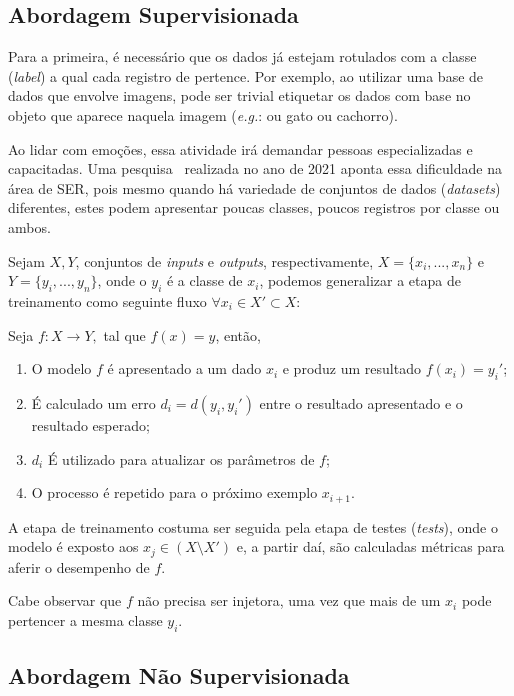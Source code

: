 \subsection{Abordagem Supervisionada}

Para a primeira, é necessário que os dados já estejam rotulados com a classe (\textit{label}) a qual cada registro de pertence. Por exemplo, ao utilizar uma base de dados que envolve imagens, pode ser trivial etiquetar os dados com base no objeto que aparece naquela imagem (\textit{e.g.}: ou gato ou cachorro).

Ao lidar com emoções, essa atividade irá demandar pessoas especializadas e capacitadas. Uma pesquisa~\cite{32} realizada no ano de 2021 aponta essa dificuldade na área de \acrshort{SER}, pois mesmo quando há variedade de conjuntos de dados (\textit{datasets}) diferentes, estes podem apresentar poucas classes, poucos registros por classe ou ambos.

Sejam $X, Y$, conjuntos de \textit{inputs} e \textit{outputs}, respectivamente, $X=\{x_i, ..., x_n\}$ e $Y=\{y_i, ..., y_n\}$, onde o $y_i$ é a classe de $x_i$, podemos generalizar a etapa de treinamento como seguinte fluxo $\forall x_i \in X' \subset X$:

Seja $f: X \rightarrow Y,$ tal que $f(x) = y$, então,

\begin{enumerate}
    \item O modelo $f$ é apresentado a um dado $x_i$ e produz um resultado $f(x_i) = y_i'$;
    \item É calculado um erro $d_i = d(y_i, y_i')$ entre o resultado apresentado e o resultado esperado;
    \item $d_i$ É utilizado para atualizar os parâmetros de $f$;
    \item O processo é repetido para o próximo exemplo $x_{i+1}$.
\end{enumerate}

A etapa de treinamento costuma ser seguida pela etapa de testes (\textit{tests}), onde o modelo é exposto aos $x_j \in (X \setminus X')$ e, a partir daí, são calculadas métricas para aferir o desempenho de $f$.

Cabe observar que $f$ não precisa ser injetora, uma vez que mais de um $x_i$ pode pertencer a mesma classe $y_i$.

\subsection{Abordagem Não Supervisionada}

